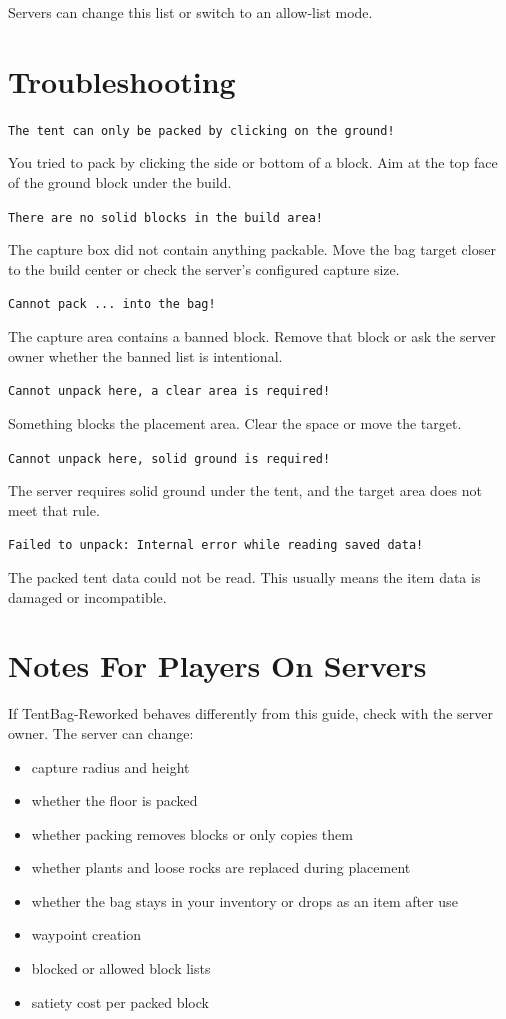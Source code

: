 \documentclass[
  11pt,
  letterpaper,
  titlepage]{article}
\providecommand{\tightlist}{%
  \setlength{\itemsep}{0pt}\setlength{\parskip}{0pt}}
\begin{document}
Servers can change this list or switch to an allow-list mode.

\section{Troubleshooting}\label{troubleshooting}

\texttt{The\ tent\ can\ only\ be\ packed\ by\ clicking\ on\ the\ ground!}

You tried to pack by clicking the side or bottom of a block. Aim at the
top face of the ground block under the build.

\texttt{There\ are\ no\ solid\ blocks\ in\ the\ build\ area!}

The capture box did not contain anything packable. Move the bag target
closer to the build center or check the server's configured capture
size.

\texttt{Cannot\ pack\ ...\ into\ the\ bag!}

The capture area contains a banned block. Remove that block or ask the
server owner whether the banned list is intentional.

\texttt{Cannot\ unpack\ here,\ a\ clear\ area\ is\ required!}

Something blocks the placement area. Clear the space or move the target.

\texttt{Cannot\ unpack\ here,\ solid\ ground\ is\ required!}

The server requires solid ground under the tent, and the target area
does not meet that rule.

\texttt{Failed\ to\ unpack:\ Internal\ error\ while\ reading\ saved\ data!}

The packed tent data could not be read. This usually means the item data
is damaged or incompatible.

\section{Notes For Players On
Servers}\label{notes-for-players-on-servers}

If TentBag-Reworked behaves differently from this guide, check with the
server owner. The server can change:

\begin{itemize}
\tightlist
\item
  capture radius and height
\item
  whether the floor is packed
\item
  whether packing removes blocks or only copies them
\item
  whether plants and loose rocks are replaced during placement
\item
  whether the bag stays in your inventory or drops as an item after use
\item
  waypoint creation
\item
  blocked or allowed block lists
\item
  satiety cost per packed block
\end{itemize}
\end{document}
